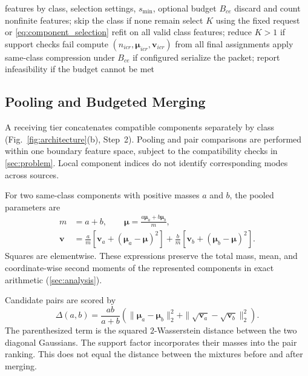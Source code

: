 \begin{algorithm}[t]
\caption{Client packet construction}
\label{alg:client}
\begin{algorithmic}[1]
\Require features by class, selection settings,
         $s_{\min}$, optional budget $B_{ce}$
    \State discard and count nonfinite features;
           skip the class if none remain
    \State select $K$ using the fixed request or
           \eqref{eq:component_selection}
    \State refit on all valid class features;
           reduce $K>1$ if support checks fail
    \State compute
           $(n_{icr},\bm\mu_{icr},\bm v_{icr})$
           from all final assignments
\EndFor
\State apply same-class compression under $B_{ce}$
       if configured
\State serialize the packet; report infeasibility
       if the budget cannot be met
\end{algorithmic}
\end{algorithm}
\subsection{Pooling and Budgeted Merging}

A receiving tier concatenates compatible components
separately by class
(Fig.~\ref{fig:architecture}(b), Step~2).
Pooling and pair comparisons are performed within
one boundary feature space, subject to the compatibility
checks in \cref{sec:problem}.
Local component indices do not identify corresponding
modes across sources.

For two same-class components with positive masses
$a$ and $b$, the pooled parameters are
\begin{align}
m
&=a+b,
\qquad
\bm\mu=
\frac{a\bm\mu_a+b\bm\mu_b}{m},
\label{eq:poolmean}\\
\bm v
&=
\frac{a}{m}
\left[\bm v_a+(\bm\mu_a-\bm\mu)^2\right] +
\frac{b}{m}
\left[\bm v_b+(\bm\mu_b-\bm\mu)^2\right].
\label{eq:poolvar}
\end{align}
Squares are elementwise.
These expressions preserve the total mass, mean,
and coordinate-wise second moments of the represented
components in exact arithmetic
(\cref{sec:analysis}).

Candidate pairs are scored by
\begin{equation}
\label{eq:mergecost}
\Delta(a,b)
=
\frac{ab}{a+b}
\left(
\|\bm\mu_a-\bm\mu_b\|_2^2
+
\|\sqrt{\bm v_a}-\sqrt{\bm v_b}\|_2^2
\right).
\end{equation}
The parenthesized term is the squared
$2$-Wasserstein distance between the two diagonal
Gaussians.
The support factor incorporates their masses into
the pair ranking.
This does not equal the distance between
the mixtures before and after merging.

